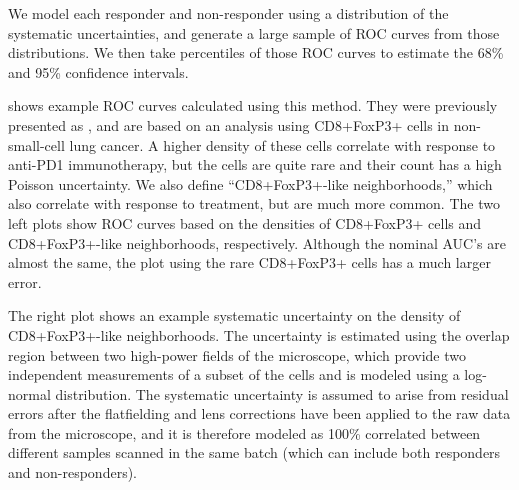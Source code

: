 \documentclass[11pt]{article}
\newcommand{\AUC}{AUC}
\begin{document}
We model each responder and non-responder using a distribution of the systematic uncertainties, and generate a large sample of ROC curves from those distributions.  We then take percentiles of those ROC curves to estimate the 68\% and 95\% confidence intervals.

 shows example ROC curves calculated using this method.  They were previously presented as \autocite{SITC2023poster}, and are based on an analysis using CD8+FoxP3+ cells in non-small-cell lung cancer.  A higher density of these cells correlate with response to anti-PD1 immunotherapy, but the cells are quite rare and their count has a high Poisson uncertainty.  We also define ``CD8+FoxP3+-like neighborhoods,'' which also correlate with response to treatment, but are much more common.  The two left plots show ROC curves based on the densities of CD8+FoxP3+ cells and CD8+FoxP3+-like neighborhoods, respectively.  Although the nominal \AUC's are almost the same, the plot using the rare CD8+FoxP3+ cells has a much larger error.

The right plot shows an example systematic uncertainty on the density of CD8+FoxP3+-like neighborhoods.  The uncertainty is estimated using the overlap region between two high-power fields of the microscope, which provide two independent measurements of a subset of the cells and is modeled using a log-normal distribution.  The systematic uncertainty is assumed to arise from residual errors after the flatfielding and lens corrections have been applied to the raw data from the microscope, and it is therefore modeled as 100\% correlated between different samples scanned in the same batch (which can include both responders and non-responders).
\end{document}

